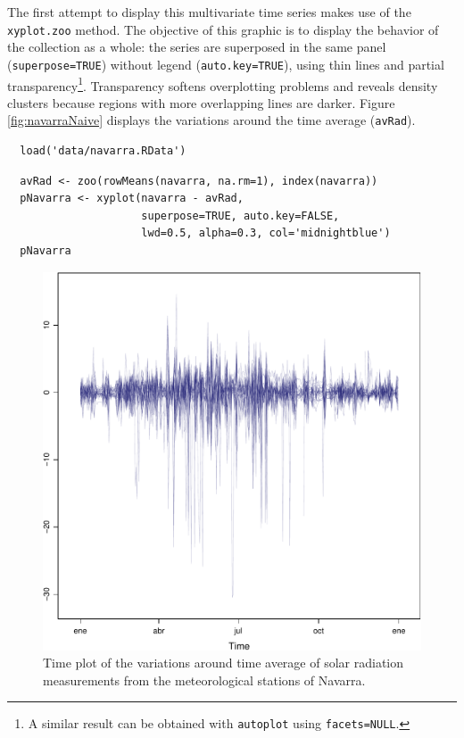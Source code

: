\documentclass[smallroyalvopaper]{memoir}
\begin{document}
The first attempt to display this multivariate time series makes use
of the \texttt{xyplot.zoo} method. The objective of this graphic is to
display the behavior of the collection as a whole: the series are
superposed in the same panel (\texttt{superpose=TRUE}) without legend
(\texttt{auto.key=TRUE}), using thin lines and partial
transparency\footnote{A similar result can be obtained with \texttt{autoplot} using \texttt{facets=NULL}.}. Transparency softens overplotting problems and reveals
density clusters because regions with more overlapping lines are
darker. Figure \ref{fig:navarraNaive} displays the variations
around the time average (\texttt{avRad}).

\lstset{language=r,label= ,caption= ,captionpos=b,numbers=none}
\begin{lstlisting}
  load('data/navarra.RData')
\end{lstlisting}


\lstset{language=r,label= ,caption= ,captionpos=b,numbers=none}
\begin{lstlisting}
  avRad <- zoo(rowMeans(navarra, na.rm=1), index(navarra))
  pNavarra <- xyplot(navarra - avRad,
                     superpose=TRUE, auto.key=FALSE,
                     lwd=0.5, alpha=0.3, col='midnightblue') 
  pNavarra
\end{lstlisting}

\begin{figure}[htbp]
\centering
\includegraphics[width=.9\linewidth]{figs/navarra.pdf}
\caption{\label{fig:org81dd1c9}
Time plot of the variations around time average of solar radiation measurements from the meteorological stations of Navarra.}
\end{figure}
\end{document}
